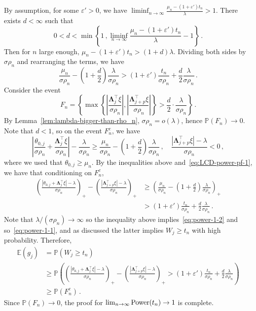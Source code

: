 \documentclass[11pt]{article}
\newcommand{\bLambda}{\boldsymbol{\Lambda}}
\newcommand{\Power}{{\rm Power}}
\newcommand{\Expected}{\mathbb{E}}
\newcommand{\Prob}{\mathbb{P}}
\begin{document}
By assumption, for some $\varepsilon'>0$, we have $\liminf_{n\to\infty}\frac{\mu_n-(1+\varepsilon')t_n}{\lambda}>1$. There exists $d<\infty$ such that 
\[
0<d<\min\left\{1\,, \liminf_{n\to\infty} \frac{\mu_n-(1+\varepsilon')t_n}{\lambda}-1\right\}\,.
\]
Then for $n$ large enough, $\mu_n-(1+\varepsilon')t_n>(1+d)\lambda$. Dividing both sides by $\sigma\rho_n$ and rearranging the terms, we have
\begin{equation}\label{eq:LCD-power-pf-1}
    \frac{\mu_n}{\sigma\rho_n}-\left(1+\frac{d}{2}\right)\frac{\lambda}{\sigma\rho_n}>(1+\varepsilon')\frac{t_n}{\sigma\rho_n}+\frac{d}{2}\frac{\lambda}{\sigma\rho_n}\,.
\end{equation}
Consider the event
\[
F_n = \left\{\max\left\{\left|\frac{\bLambda_j^\top\xi}{\sigma\rho_n}\right|,\left|\frac{\bLambda_{j+p}^\top\xi}{\sigma\rho_n}\right|\right\}> \frac{d}{2}\cdot \frac{\lambda}{\sigma\rho_n}\right\}\,.
\]
By Lemma~\ref{lem:lambda-bigger-than-rho_n}, $\sigma\rho_n=o(\lambda)$, hence $\Prob(F_n)\to 0$. Note that $d<1$, so on the event $F_n^c$, we have 
\[
\left|\frac{\theta_{0,j}}{\sigma\rho_n}+\frac{\bLambda_j^\top\xi}{\sigma\rho_n}\right|-\frac{\lambda}{\sigma\rho_n}\ge\frac{\mu_n}{\sigma\rho_n}-\left(1+\frac{d}{2}\right)\frac{\lambda}{\sigma\rho_n}\,,\quad \frac{|\bLambda_{j+p}^\top\xi|-\lambda}{\sigma\rho_n}<0\,,
\]
where we used that $\theta_{0,j}\ge\mu_n$. By the inequalities above and~\eqref{eq:LCD-power-pf-1}, we have that conditioning on $F_n^c$,
\begin{align*}
    \left(\frac{|\theta_{0,j}+\bLambda_j^\top\xi|-\lambda}{\sigma\rho_n}\right)_+-\left(\frac{|\bLambda_{j+p}^\top\xi|-\lambda}{\sigma\rho_n}\right)_+ &\ge \left(\frac{\mu_n}{\sigma\rho_n}-\left(1+\frac{d}{2}\right)\frac{\lambda}{\sigma\rho_n}\right)_+\\
    &>(1+\varepsilon')\frac{t_n}{\sigma\rho_n}+\frac{d}{2}\frac{\lambda}{\sigma\rho_n}\,.
\end{align*}
Note that $\lambda/(\sigma\rho_n)\to \infty$ so the inequality above implies~\eqref{eq:power-1-2} and so~\eqref{eq:power-1-1}, and as discussed the latter implies $W_j\ge t_n$ with high probability. Therefore,
\begin{align*}
    \Expected(g_j) & = \Prob(W_j\ge t_n)\\
        & \ge \Prob\left(\left(\frac{|\theta_{0,j}+\bLambda_j^\top\xi|-\lambda}{\sigma\rho_n}\right)_+-\left(\frac{|\bLambda_{j+p}^\top\xi|-\lambda}{\sigma\rho_n}\right)_+>(1+\varepsilon')\frac{t_n}{\sigma\rho_n}+\frac{d}{2}\frac{\lambda}{\sigma\rho_n}\right)\\
        &\ge \Prob(F_n^c)\,.
\end{align*}
Since $\Prob(F_n)\to0$, the proof for $\lim_{n\to\infty}\Power(t_n)\to 1$ is complete.
\end{document}
